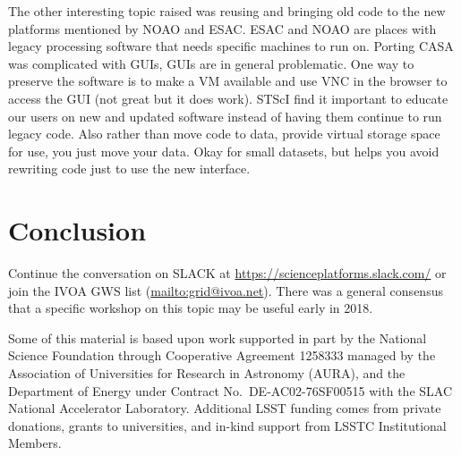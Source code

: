 \documentclass[11pt,twoside]{article}
\begin{document}
The other interesting topic raised was reusing and bringing old code to the new platforms mentioned by NOAO and ESAC.
ESAC and NOAO are places with legacy processing software that needs specific machines to run on.
Porting CASA was complicated with GUIs, GUIs are in general problematic.
One way to preserve the software is to make a VM available and use VNC in the browser to access the GUI (not great but it does work).
STScI find it  important to educate our users on new and updated software instead of having them continue to run legacy code.
Also rather than move code to data, provide virtual storage space for use, you just move your data. Okay for small datasets, but helps you avoid rewriting code just to use the new interface.




\section{Conclusion}

Continue the conversation on SLACK at \url{https://scienceplatforms.slack.com/} or join the IVOA GWS list (\url{mailto:grid@ivoa.net}). There was a general consensus that a specific workshop on this topic may be useful early in 2018.

\acknowledgments Some of this material is based upon work supported in part by the National Science Foundation through Cooperative Agreement 1258333 managed by the Association of Universities for Research in Astronomy (AURA), and the Department of Energy under Contract No.\ DE-AC02-76SF00515 with the SLAC National Accelerator Laboratory. Additional LSST funding comes from private donations, grants to universities, and in-kind support from LSSTC Institutional Members.

\end{document}
